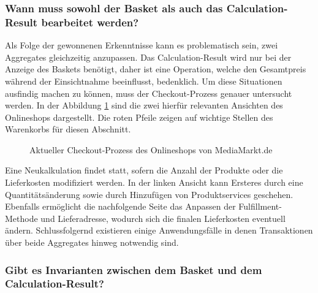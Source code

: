 \subsubsection{Wann muss sowohl der Basket als auch das Calculation-Result bearbeitet werden?}


Als Folge der gewonnenen Erkenntnisse kann es problematisch sein, zwei Aggregates gleichzeitig anzupassen. Das Calculation-Result wird nur bei der Anzeige des Baskets benötigt, daher ist eine Operation, welche den Gesamtpreis während der Einsichtnahme beeinflusst, bedenklich. Um diese Situationen ausfindig machen zu können, muss der Checkout-Prozess genauer untersucht werden. In der Abbildung \ref{fig:Checkout-Process} sind die zwei hierfür relevanten Ansichten des Onlineshops dargestellt. Die roten Pfeile zeigen auf wichtige Stellen des Warenkorbs für diesen Abschnitt.

\begin{figure}[H]
	\vspace{0.5cm}
	\centering
	\caption{Aktueller Checkout-Prozess des Onlineshops von MediaMarkt.de}
	\label{fig:Checkout-Process}
\end{figure}

Eine Neukalkulation findet statt, sofern die Anzahl der Produkte oder die Lieferkosten modifiziert werden. In der linken Ansicht kann Ersteres durch eine Quantitätsänderung sowie durch Hinzufügen von Produktservices geschehen. Ebenfalls ermöglicht die nachfolgende Seite das Anpassen der Fulfillment-Methode und Lieferadresse, wodurch sich die finalen Lieferkosten eventuell ändern. Schlussfolgernd existieren einige Anwendungsfälle in denen Transaktionen über beide Aggregates hinweg notwendig sind.

\subsubsection{Gibt es Invarianten zwischen dem Basket und dem Calculation-Result?}

